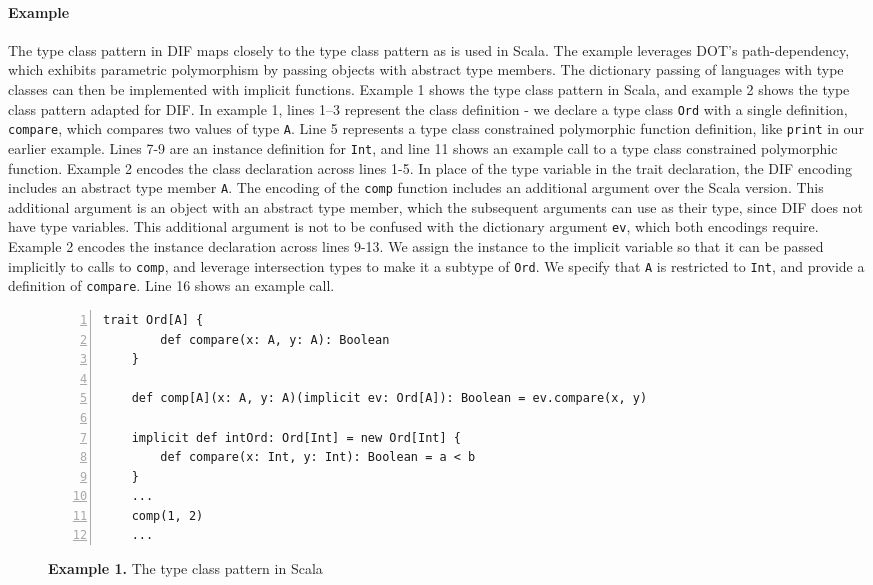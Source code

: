 \paragraph{Example} The type class pattern \cite{OBLB18} in DIF maps closely to
the type class pattern as is used in Scala. The example leverages DOT's
path-dependency, which exhibits parametric polymorphism by passing objects with
abstract type members. The dictionary passing of languages with type classes can
then be implemented with implicit functions. Example 1 shows the type class
pattern in Scala, and example 2 shows the type class pattern adapted for DIF. In
example 1, lines 1--3 represent the class definition - we declare a type class
\texttt{Ord} with a single definition, \texttt{compare}, which compares two
values of type \texttt{A}. Line 5 represents a type class constrained
polymorphic function definition, like \texttt{print} in our earlier example.
Lines 7-9 are an instance definition for \texttt{Int}, and line 11 shows an
example call to a type class constrained polymorphic function. Example 2 encodes
the class declaration across lines 1-5. In place of the type variable in the
trait declaration, the DIF encoding includes an abstract type member \texttt{A}.
The encoding of the \texttt{comp} function includes an additional argument over
the Scala version. This additional argument is an object with an abstract type
member, which the subsequent arguments can use as their type, since DIF does not
have type variables. This additional argument is not to be confused with the
dictionary argument \texttt{ev}, which both encodings require. Example 2 encodes
the instance declaration across lines 9-13. We assign the instance to the
implicit variable so that it can be passed implicitly to calls to \texttt{comp},
and leverage intersection types to make it a subtype of \texttt{Ord}. We specify
that \texttt{A} is restricted to \texttt{Int}, and provide a definition of
\texttt{compare}. Line 16 shows an example call.

\begin{figure*}[h]
\begin{lstlisting}[mathescape,numbers=left]
    trait Ord[A] {
        def compare(x: A, y: A): Boolean
    }

    def comp[A](x: A, y: A)(implicit ev: Ord[A]): Boolean = ev.compare(x, y)

    implicit def intOrd: Ord[Int] = new Ord[Int] {
        def compare(x: Int, y: Int): Boolean = a < b
    }
    ...
    comp(1, 2)
    ...
\end{lstlisting}
\caption*{\textbf{Example 1.} The type class pattern in Scala}
\end{figure*}

